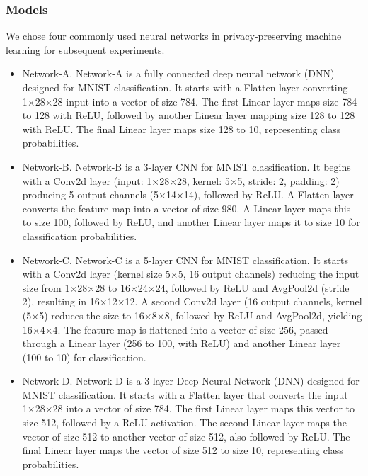\documentclass[conference]{IEEEtran}
\begin{document}
\subsubsection{Models}
We chose four commonly used neural networks in privacy-preserving machine learning \cite{liu2024pencilprivateextensiblecollaborative} for subsequent experiments.


\begin{itemize}
    \item Network-A.
    Network-A is a fully connected deep neural network (DNN) designed for MNIST classification. It starts with a Flatten layer converting 1×28×28 input into a vector of size 784. The first Linear layer maps size 784 to 128 with ReLU, followed by another Linear layer mapping size 128 to 128 with ReLU. The final Linear layer maps size 128 to 10, representing class probabilities.
    \item Network-B.
    Network-B is a 3-layer CNN for MNIST classification. It begins with a Conv2d layer (input: 1×28×28, kernel: 5×5, stride: 2, padding: 2) producing 5 output channels (5×14×14), followed by ReLU. A Flatten layer converts the feature map into a vector of size 980. A Linear layer maps this to size 100, followed by ReLU, and another Linear layer maps it to size 10 for classification probabilities.
    \item Network-C.
    Network-C is a 5-layer CNN for MNIST classification. It starts with a Conv2d layer (kernel size 5×5, 16 output channels) reducing the input size from 1×28×28 to 16×24×24, followed by ReLU and AvgPool2d (stride 2), resulting in 16×12×12. A second Conv2d layer (16 output channels, kernel (5×5) reduces the size to 16×8×8, followed by ReLU and AvgPool2d, yielding 16×4×4. The feature map is flattened into a vector of size 256, passed through a Linear layer (256 to 100, with ReLU) and another Linear layer (100 to 10) for classification.
    \item Network-D.
    Network-D is a 3-layer Deep Neural Network (DNN) designed for MNIST classification. It starts with a Flatten layer that converts the input 1×28×28 into a vector of size 784. The first Linear layer maps this vector to size 512, followed by a ReLU activation. The second Linear layer maps the vector of size 512 to another vector of size 512, also followed by ReLU. The final Linear layer maps the vector of size 512 to size 10, representing class probabilities.
    

\end{itemize}
\end{document}
